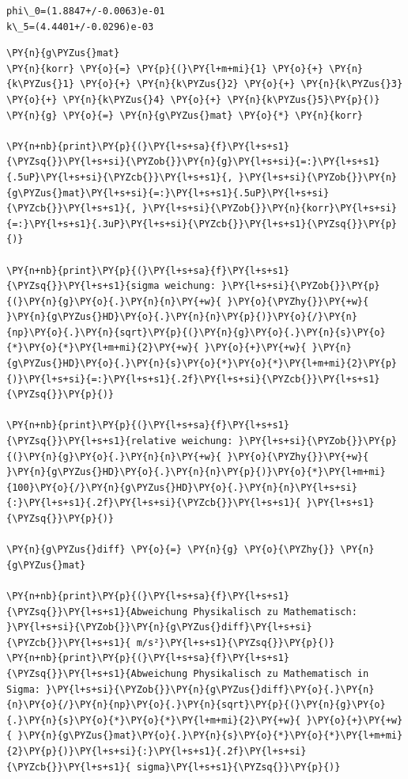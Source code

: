     \begin{Verbatim}[commandchars=\\\{\}]
phi\_0=(1.8847+/-0.0063)e-01
k\_5=(4.4401+/-0.0296)e-03
    \end{Verbatim}

    \begin{tcolorbox}[breakable, size=fbox, boxrule=1pt, pad at break*=1mm,colback=cellbackground, colframe=cellborder]
\begin{Verbatim}[commandchars=\\\{\}]
\PY{n}{g\PYZus{}mat}
\PY{n}{korr} \PY{o}{=} \PY{p}{(}\PY{l+m+mi}{1} \PY{o}{+} \PY{n}{k\PYZus{}1} \PY{o}{+} \PY{n}{k\PYZus{}2} \PY{o}{+} \PY{n}{k\PYZus{}3} \PY{o}{+} \PY{n}{k\PYZus{}4} \PY{o}{+} \PY{n}{k\PYZus{}5}\PY{p}{)}
\PY{n}{g} \PY{o}{=} \PY{n}{g\PYZus{}mat} \PY{o}{*} \PY{n}{korr}

\PY{n+nb}{print}\PY{p}{(}\PY{l+s+sa}{f}\PY{l+s+s1}{\PYZsq{}}\PY{l+s+si}{\PYZob{}}\PY{n}{g}\PY{l+s+si}{=:}\PY{l+s+s1}{.5uP}\PY{l+s+si}{\PYZcb{}}\PY{l+s+s1}{, }\PY{l+s+si}{\PYZob{}}\PY{n}{g\PYZus{}mat}\PY{l+s+si}{=:}\PY{l+s+s1}{.5uP}\PY{l+s+si}{\PYZcb{}}\PY{l+s+s1}{, }\PY{l+s+si}{\PYZob{}}\PY{n}{korr}\PY{l+s+si}{=:}\PY{l+s+s1}{.3uP}\PY{l+s+si}{\PYZcb{}}\PY{l+s+s1}{\PYZsq{}}\PY{p}{)}

\PY{n+nb}{print}\PY{p}{(}\PY{l+s+sa}{f}\PY{l+s+s1}{\PYZsq{}}\PY{l+s+s1}{sigma weichung: }\PY{l+s+si}{\PYZob{}}\PY{p}{(}\PY{n}{g}\PY{o}{.}\PY{n}{n}\PY{+w}{ }\PY{o}{\PYZhy{}}\PY{+w}{ }\PY{n}{g\PYZus{}HD}\PY{o}{.}\PY{n}{n}\PY{p}{)}\PY{o}{/}\PY{n}{np}\PY{o}{.}\PY{n}{sqrt}\PY{p}{(}\PY{n}{g}\PY{o}{.}\PY{n}{s}\PY{o}{*}\PY{o}{*}\PY{l+m+mi}{2}\PY{+w}{ }\PY{o}{+}\PY{+w}{ }\PY{n}{g\PYZus{}HD}\PY{o}{.}\PY{n}{s}\PY{o}{*}\PY{o}{*}\PY{l+m+mi}{2}\PY{p}{)}\PY{l+s+si}{=:}\PY{l+s+s1}{.2f}\PY{l+s+si}{\PYZcb{}}\PY{l+s+s1}{\PYZsq{}}\PY{p}{)}

\PY{n+nb}{print}\PY{p}{(}\PY{l+s+sa}{f}\PY{l+s+s1}{\PYZsq{}}\PY{l+s+s1}{relative weichung: }\PY{l+s+si}{\PYZob{}}\PY{p}{(}\PY{n}{g}\PY{o}{.}\PY{n}{n}\PY{+w}{ }\PY{o}{\PYZhy{}}\PY{+w}{ }\PY{n}{g\PYZus{}HD}\PY{o}{.}\PY{n}{n}\PY{p}{)}\PY{o}{*}\PY{l+m+mi}{100}\PY{o}{/}\PY{n}{g\PYZus{}HD}\PY{o}{.}\PY{n}{n}\PY{l+s+si}{:}\PY{l+s+s1}{.2f}\PY{l+s+si}{\PYZcb{}}\PY{l+s+s1}{ }\PY{l+s+s1}{\PYZsq{}}\PY{p}{)}

\PY{n}{g\PYZus{}diff} \PY{o}{=} \PY{n}{g} \PY{o}{\PYZhy{}} \PY{n}{g\PYZus{}mat}

\PY{n+nb}{print}\PY{p}{(}\PY{l+s+sa}{f}\PY{l+s+s1}{\PYZsq{}}\PY{l+s+s1}{Abweichung Physikalisch zu Mathematisch: }\PY{l+s+si}{\PYZob{}}\PY{n}{g\PYZus{}diff}\PY{l+s+si}{\PYZcb{}}\PY{l+s+s1}{ m/s²}\PY{l+s+s1}{\PYZsq{}}\PY{p}{)}
\PY{n+nb}{print}\PY{p}{(}\PY{l+s+sa}{f}\PY{l+s+s1}{\PYZsq{}}\PY{l+s+s1}{Abweichung Physikalisch zu Mathematisch in Sigma: }\PY{l+s+si}{\PYZob{}}\PY{n}{g\PYZus{}diff}\PY{o}{.}\PY{n}{n}\PY{o}{/}\PY{n}{np}\PY{o}{.}\PY{n}{sqrt}\PY{p}{(}\PY{n}{g}\PY{o}{.}\PY{n}{s}\PY{o}{*}\PY{o}{*}\PY{l+m+mi}{2}\PY{+w}{ }\PY{o}{+}\PY{+w}{ }\PY{n}{g\PYZus{}mat}\PY{o}{.}\PY{n}{s}\PY{o}{*}\PY{o}{*}\PY{l+m+mi}{2}\PY{p}{)}\PY{l+s+si}{:}\PY{l+s+s1}{.2f}\PY{l+s+si}{\PYZcb{}}\PY{l+s+s1}{ sigma}\PY{l+s+s1}{\PYZsq{}}\PY{p}{)}
\end{Verbatim}
\end{tcolorbox}


